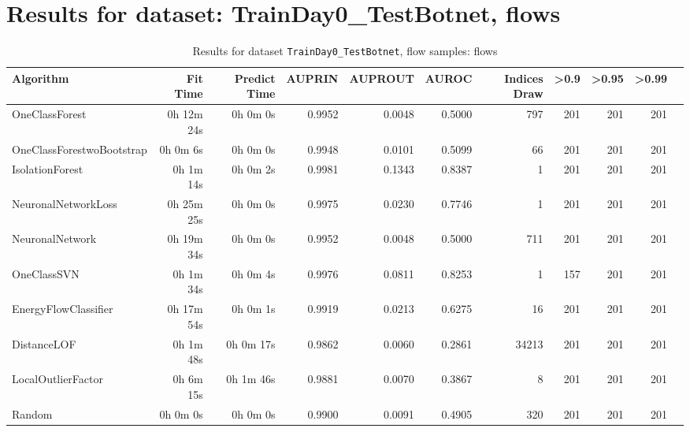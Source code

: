 \documentclass{article}
\begin{document}
\section*{Results for dataset: TrainDay0_TestBotnet, flows}
\begin{table}[h!]
\centering
\caption{Results for dataset \texttt{TrainDay0_TestBotnet}, flow samples: flows}
\label{tab:trainday0testbotnet_flows}
\begin{tabular}{lrrrrrrrrrr}
\toprule
Algorithm & Fit Time & Predict Time & AUPRIN & AUPROUT & AUROC & Indices Draw & >0.9 & >0.95 & >0.99 \\
\midrule
OneClassForest & 0h 12m 24s & 0h 0m 0s & 0.9952 & 0.0048 & 0.5000 & 797 & 201 & 201 & 201 \\
OneClassForestwoBootstrap & 0h 0m 6s & 0h 0m 0s & 0.9948 & 0.0101 & 0.5099 & 66 & 201 & 201 & 201 \\
IsolationForest & 0h 1m 14s & 0h 0m 2s & 0.9981 & 0.1343 & 0.8387 & 1 & 201 & 201 & 201 \\
NeuronalNetworkLoss & 0h 25m 25s & 0h 0m 0s & 0.9975 & 0.0230 & 0.7746 & 1 & 201 & 201 & 201 \\
NeuronalNetwork & 0h 19m 34s & 0h 0m 0s & 0.9952 & 0.0048 & 0.5000 & 711 & 201 & 201 & 201 \\
OneClassSVN & 0h 1m 34s & 0h 0m 4s & 0.9976 & 0.0811 & 0.8253 & 1 & 157 & 201 & 201 \\
EnergyFlowClassifier & 0h 17m 54s & 0h 0m 1s & 0.9919 & 0.0213 & 0.6275 & 16 & 201 & 201 & 201 \\
DistanceLOF & 0h 1m 48s & 0h 0m 17s & 0.9862 & 0.0060 & 0.2861 & 34213 & 201 & 201 & 201 \\
LocalOutlierFactor & 0h 6m 15s & 0h 1m 46s & 0.9881 & 0.0070 & 0.3867 & 8 & 201 & 201 & 201 \\
Random & 0h 0m 0s & 0h 0m 0s & 0.9900 & 0.0091 & 0.4905 & 320 & 201 & 201 & 201 \\
\bottomrule
\end{tabular}
\end{table}
\end{document}
